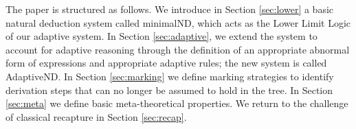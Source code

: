 \documentclass[]{article}
\begin{document}

The paper is structured as follows. We introduce in Section \ref{sec:lower} a basic natural deduction system called {\sf minimalND}, which acts as the Lower Limit Logic of our adaptive system. In Section \ref{sec:adaptive}, we extend the system to account for adaptive reasoning through the definition of an appropriate abnormal form of expressions and appropriate adaptive rules; the new system is called {\sf AdaptiveND}. In Section \ref{sec:marking} we define marking strategies to identify derivation steps that can no longer be assumed to hold in the tree. In Section \ref{sec:meta} we define basic meta-theoretical properties. We return to the challenge of classical recapture in Section \ref{sec:recap}.


\end{document}
